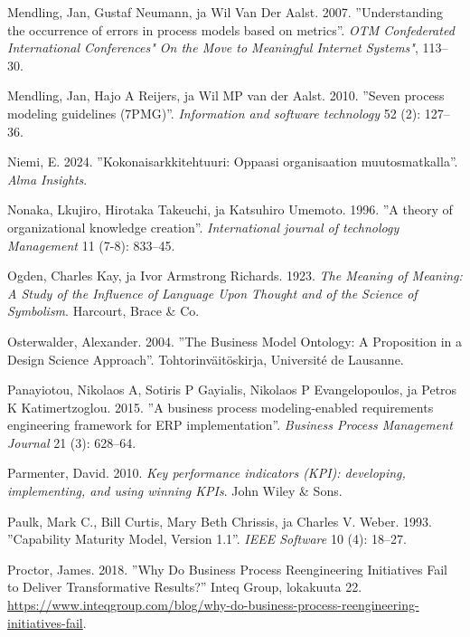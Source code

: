 \documentclass[
  finnish,
  letterpaper,
  DIV=11,
  numbers=noendperiod,
  oneside]{scrreprt}
\newlength{\cslhangindent}
\newenvironment{CSLReferences}[2] %
 {\begin{list}{}{%
  \setlength{\itemindent}{0pt}
  \setlength{\leftmargin}{0pt}
  \setlength{\parsep}{0pt}
  \ifodd #1
   \setlength{\leftmargin}{\cslhangindent}
   \setlength{\itemindent}{-1\cslhangindent}
  \fi
  \setlength{\itemsep}{#2\baselineskip}}}
 {\end{list}}
\begin{document}
\begin{CSLReferences}{1}{1}
Mendling, Jan, Gustaf Neumann, ja Wil Van Der Aalst. 2007.
{''Understanding the occurrence of errors in process models based on
metrics''}. \emph{OTM Confederated International Conferences" On the
Move to Meaningful Internet Systems"}, 113--30.

Mendling, Jan, Hajo A Reijers, ja Wil MP van der Aalst. 2010. {''Seven
process modeling guidelines (7PMG)''}. \emph{Information and software
technology} 52 (2): 127--36.

Niemi, E. 2024. {''Kokonaisarkkitehtuuri: Oppaasi organisaation
muutosmatkalla''}. \emph{Alma Insights}.

Nonaka, Lkujiro, Hirotaka Takeuchi, ja Katsuhiro Umemoto. 1996. {''A
theory of organizational knowledge creation''}. \emph{International
journal of technology Management} 11 (7-8): 833--45.

Ogden, Charles Kay, ja Ivor Armstrong Richards. 1923. \emph{The Meaning
of Meaning: A Study of the Influence of Language Upon Thought and of the
Science of Symbolism}. Harcourt, Brace \& Co.

Osterwalder, Alexander. 2004. {''The Business Model Ontology: A
Proposition in a Design Science Approach''}. Tohtorinväitöskirja,
Université de Lausanne.

Panayiotou, Nikolaos A, Sotiris P Gayialis, Nikolaos P Evangelopoulos,
ja Petros K Katimertzoglou. 2015. {''A business process modeling-enabled
requirements engineering framework for ERP implementation''}.
\emph{Business Process Management Journal} 21 (3): 628--64.

Parmenter, David. 2010. \emph{Key performance indicators (KPI):
developing, implementing, and using winning KPIs}. John Wiley \& Sons.

Paulk, Mark C., Bill Curtis, Mary Beth Chrissis, ja Charles V. Weber.
1993. {''Capability Maturity Model, Version 1.1''}. \emph{IEEE Software}
10 (4): 18--27.

Proctor, James. 2018. {''Why Do Business Process Reengineering
Initiatives Fail to Deliver Transformative Results?''} Inteq Group,
lokakuuta 22.
\url{https://www.inteqgroup.com/blog/why-do-business-process-reengineering-initiatives-fail}.


\end{CSLReferences}
\end{document}
